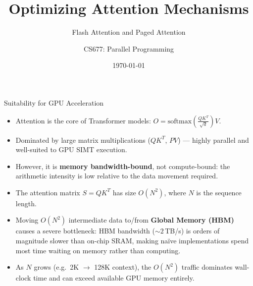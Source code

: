 \documentclass{beamer}
\title{Optimizing Attention Mechanisms}
\subtitle{Flash Attention and Paged Attention}
\author{CS677: Parallel Programming}
\date{\today}
\begin{document}
\frame{\titlepage}

\begin{frame}{Suitability for GPU Acceleration}
    \begin{itemize}
        \item Attention is the core of Transformer models: $O = \text{softmax}\!\left(\frac{QK^T}{\sqrt{d}}\right)V$.
        \item Dominated by large matrix multiplications ($QK^T$, $PV$) --- highly parallel and well-suited to GPU SIMT execution.
        \item However, it is \textbf{memory bandwidth-bound}, not compute-bound: the arithmetic intensity is low relative to the data movement required.
        \item The attention matrix $S = QK^T$ has size $O(N^2)$, where $N$ is the sequence length.
        \item Moving $O(N^2)$ intermediate data to/from \textbf{Global Memory (HBM)} causes a severe bottleneck: HBM bandwidth (${\sim}2$\,TB/s) is orders of magnitude slower than on-chip SRAM, making na\"ive implementations spend most time waiting on memory rather than computing.
        \item As $N$ grows (e.g.\ 2K $\to$ 128K context), the $O(N^2)$ traffic dominates wall-clock time and can exceed available GPU memory entirely.
    \end{itemize}
\end{frame}
\end{document}
